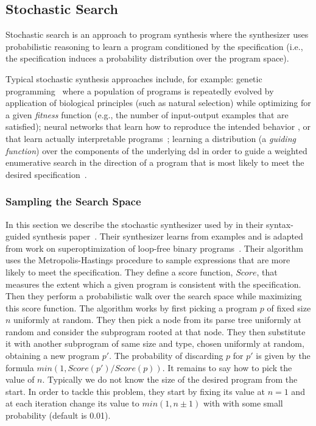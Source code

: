 \subsection{Stochastic Search}
\label{sec:stochastic-search}

Stochastic search is an approach to program synthesis where the synthesizer uses
probabilistic reasoning to learn a program conditioned by the specification
(i.e., the specification induces a probability distribution over the program
space).

Typical stochastic synthesis approaches include, for example:
genetic programming~\cite{Weimer:2009:AFP} where a population of programs is
repeatedly evolved by application of biological principles (such as natural
selection) while optimizing for a given \textit{fitness} function (e.g., the
number of input-output examples that are satisfied);
neural networks that learn how to reproduce the intended
behavior%
, or that learn actually interpretable
programs~\cite{Parisotto:2016:NPS};
learning a distribution (a \textit{guiding function}) over the components of
the underlying \gls{dsl} in order to guide a weighted enumerative search in the
direction of a program that is most likely to meet the desired
specification~\cite{Lee:ASP:2018,Balog:2017:DC}. %

\subsubsection{Sampling the Search Space}
\label{sec:sampling}

In this section we describe the stochastic synthesizer used by
\citeauthor{Alur:sygus:2013} in their syntax-guided synthesis
paper~\cite{Alur:sygus:2013}.
Their synthesizer learns from examples and is adapted from work on
superoptimization of loop-free binary programs~\cite{Schkufza:2013:SS}.
Their algorithm uses the Metropolis-Hastings procedure to sample expressions
that are more likely to meet the specification.
They define a score function, $Score$, that measures the extent which a given
program is consistent with the specification.
Then they perform a probabilistic walk over the search space while maximizing
this score function.
The algorithm works by first picking a program $p$ of fixed size $n$ uniformly
at random.
They then pick a node from its parse tree uniformly at random and consider the
subprogram rooted at that node.
They then substitute it with another subprogram of same size and type, chosen
uniformly at random, obtaining a new program $p'$.
The probability of discarding $p$ for $p'$ is given by the formula $min(1,
Score(p')/Score(p))$.
It remains to say how to pick the value of $n$.
Typically we do not know the size of the desired program from the start.
In order to tackle this problem, they start by fixing its value at $n = 1$ and
at each iteration change its value to $min(1, n\pm{}1)$ with with some small
probability (default is 0.01).
